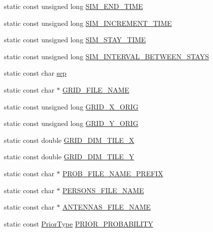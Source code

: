 \begin{DoxyCompactItemize}
\item 
static const unsigned long \hyperlink{class_constants_affb253c69b40f5979cd07383245331b7}{S\+I\+M\+\_\+\+E\+N\+D\+\_\+\+T\+I\+ME}
\item 
static const unsigned long \hyperlink{class_constants_ae689749614ecdd38b50a014400138bc2}{S\+I\+M\+\_\+\+I\+N\+C\+R\+E\+M\+E\+N\+T\+\_\+\+T\+I\+ME}
\item 
static const unsigned long \hyperlink{class_constants_a885a54aa8b2d13632ae3e8ff8e7664fb}{S\+I\+M\+\_\+\+S\+T\+A\+Y\+\_\+\+T\+I\+ME}
\item 
static const unsigned long \hyperlink{class_constants_a396cc1e9abbdf0a536886ebfd6b28045}{S\+I\+M\+\_\+\+I\+N\+T\+E\+R\+V\+A\+L\+\_\+\+B\+E\+T\+W\+E\+E\+N\+\_\+\+S\+T\+A\+YS}
\item 
static const char \hyperlink{class_constants_afc927f63cc5fbb912114d6b0f28b8b4f}{sep}
\item 
static const char $\ast$ \hyperlink{class_constants_aa2fd1c5551c8dab10dc1bd4c0cd0db8f}{G\+R\+I\+D\+\_\+\+F\+I\+L\+E\+\_\+\+N\+A\+ME}
\item 
static const unsigned long \hyperlink{class_constants_ac09062322e1ab9b6e1ca3a568b11c376}{G\+R\+I\+D\+\_\+\+X\+\_\+\+O\+R\+IG}
\item 
static const unsigned long \hyperlink{class_constants_ace48b30468931aaf452ab7a6daf573e0}{G\+R\+I\+D\+\_\+\+Y\+\_\+\+O\+R\+IG}
\item 
static const double \hyperlink{class_constants_a4400d3f97fa2e2be6091a8005efedd7f}{G\+R\+I\+D\+\_\+\+D\+I\+M\+\_\+\+T\+I\+L\+E\+\_\+X}
\item 
static const double \hyperlink{class_constants_a08f9273d844b68a74fd979d5a46d4918}{G\+R\+I\+D\+\_\+\+D\+I\+M\+\_\+\+T\+I\+L\+E\+\_\+Y}
\item 
static const char $\ast$ \hyperlink{class_constants_a3b2d3fc0ccc4636a51190bf5b297d72d}{P\+R\+O\+B\+\_\+\+F\+I\+L\+E\+\_\+\+N\+A\+M\+E\+\_\+\+P\+R\+E\+F\+IX}
\item 
static const char $\ast$ \hyperlink{class_constants_a2388516c40960223c0aef1610fd72312}{P\+E\+R\+S\+O\+N\+S\+\_\+\+F\+I\+L\+E\+\_\+\+N\+A\+ME}
\item 
static const char $\ast$ \hyperlink{class_constants_a23f758b23b88c7cfe23b278647671acb}{A\+N\+T\+E\+N\+N\+A\+S\+\_\+\+F\+I\+L\+E\+\_\+\+N\+A\+ME}
\item 
static const \hyperlink{_prior_type_8h_a61286c562e68de246982fc393a7c23a5}{Prior\+Type} \hyperlink{class_constants_a7b31976adc7ad0f3dbed86b205e1773d}{P\+R\+I\+O\+R\+\_\+\+P\+R\+O\+B\+A\+B\+I\+L\+I\+TY}

\end{DoxyCompactItemize}
